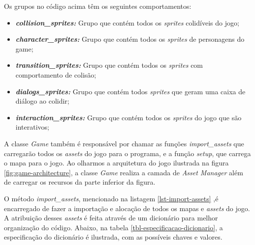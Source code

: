 

Os grupos no código acima têm os seguintes comportamentos:
\begin{itemize}
    \item \textit{\textbf{collision\_sprites: }}Grupo que contém todos os \textit{sprites} colidíveis do jogo;
    \item \textit{\textbf{character\_sprites: }}Grupo que contém todos os \textit{sprites} de personagens do game;
    \item \textit{\textbf{transition\_sprites: }}Grupo que contém todos os \textit{sprites} com comportamento de colisão;
    \item \textit{\textbf{dialogs\_sprites: }}Grupo que contém todos \textit{sprites} que geram uma caixa de diálogo ao colidir;
    \item \textit{\textbf{interaction\_sprites: }}Grupo que contém todos os \textit{sprites} do jogo que são interativos;
\end{itemize}

A classe \textit{Game} também é responsável por chamar as funções \textit{import\_assets} que carregarão todos os \textit{assets} do jogo para o programa, e a função \textit{setup}, que carrega o mapa para o jogo. Ao olharmos a arquitetura do jogo ilustrada na figura \ref{fig:game-architecture}, a classe \textit{Game} realiza a camada de \textit{Asset Manager} além de carregar os recursos da parte inferior da figura. 



O método \textit{import\_assets}, mencionado na listagem \ref{lst-import-assets} ,é encarregado de fazer a importação e alocação de todos os mapas e \textit{assets} do jogo. A atribuição desses \textit{assets} é feita através de um dicionário para melhor organização do código. Abaixo, na tabela \ref{tbl-especificacao-dicionario}, a especificação do dicionário é ilustrada, com as possíveis chaves e valores.

